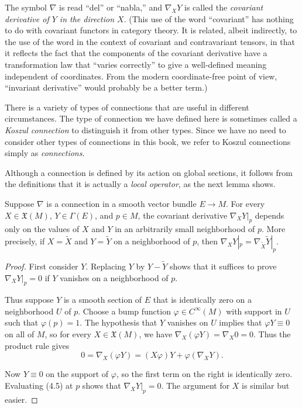 The symbol $\nabla$ is read ``del'' or ``nabla,'' and $\nabla_X Y$ is called the \emph{covariant derivative of $Y$ in the direction $X$}. (This use of the word ``covariant'' has nothing to do with covariant functors in category theory. It is related, albeit indirectly, to the use of the word in the context of covariant and contravariant tensors, in that it reflects the fact that the components of the covariant derivative have a transformation law that ``varies correctly'' to give a well-defined meaning independent of coordinates. From the modern coordinate-free point of view, ``invariant derivative'' would probably be a better term.)

There is a variety of types of connections that are useful in different circumstances. The type of connection we have defined here is sometimes called a \emph{Koszul connection} to distinguish it from other types. Since we have no need to consider other types of connections in this book, we refer to Koszul connections simply as \emph{connections}.

Although a connection is defined by its action on global sections, it follows from the definitions that it is actually a \emph{local operator}, as the next lemma shows.

\begin{lemma}[Locality]
\label{lem:connection-is-local-operator}
\leanok
Suppose $\nabla$ is a connection in a smooth vector bundle $E \to M$. For every $X \in \mathfrak{X}(M)$, $Y \in \Gamma(E)$, and $p \in M$, the covariant derivative $\nabla_X Y |_p$ depends only on the values of $X$ and $Y$ in an arbitrarily small neighborhood of $p$. More precisely, if $X = \tilde{X}$ and $Y = \tilde{Y}$ on a neighborhood of $p$, then $\nabla_X Y |_p = \nabla_{\tilde{X}} \tilde{Y} |_p$.
\end{lemma}

\begin{proof}
\leanok
First consider $Y$. Replacing $Y$ by $Y - \tilde{Y}$ shows that it suffices to prove $\nabla_X Y |_p = 0$ if $Y$ vanishes on a neighborhood of $p$.

Thus suppose $Y$ is a smooth section of $E$ that is identically zero on a neighborhood $U$ of $p$. Choose a bump function $\varphi \in C^\infty(M)$ with support in $U$ such that $\varphi(p) = 1$. The hypothesis that $Y$ vanishes on $U$ implies that $\varphi Y \equiv 0$ on all of $M$, so for every $X \in \mathfrak{X}(M)$, we have $\nabla_X(\varphi Y) = \nabla_X 0 = 0$. Thus the product rule gives
\begin{equation}
0 = \nabla_X(\varphi Y) = (X\varphi)Y + \varphi(\nabla_X Y). \tag{4.5}
\end{equation}

Now $Y \equiv 0$ on the support of $\varphi$, so the first term on the right is identically zero. Evaluating (4.5) at $p$ shows that $\nabla_X Y|_p = 0$. The argument for $X$ is similar but easier.
\end{proof}

